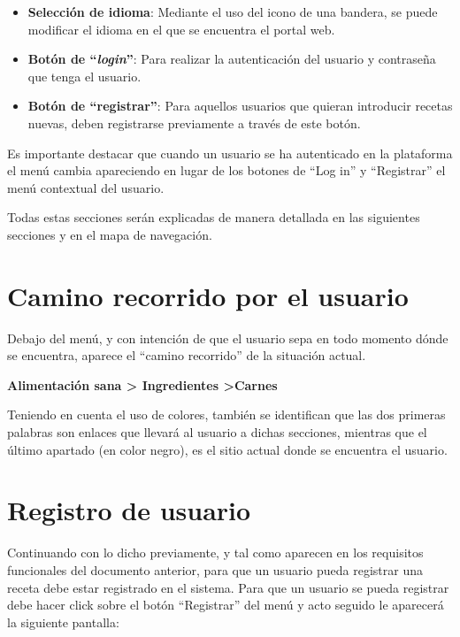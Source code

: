 \documentclass{\ClassPath/viu-tfm-template}
\begin{document}
\begin{itemize}
    \item \textbf{Selección de idioma}: Mediante el uso del icono de una bandera, se puede modificar el idioma en el que se encuentra el portal web.

    \item \textbf{Botón de “\textit{login}”}: Para realizar la autenticación del usuario y contraseña que tenga el usuario.

    \item \textbf{Botón de “registrar”}: Para aquellos usuarios que quieran introducir recetas nuevas, deben registrarse previamente a través de este botón.
    \vspace{-1em}
\end{itemize}

Es importante destacar que cuando un usuario se ha autenticado en la plataforma el menú cambia apareciendo en lugar de los botones de “Log in” y “Registrar” el menú contextual del usuario.

Todas estas secciones serán explicadas de manera detallada en las siguientes secciones y en el mapa de navegación.

\section{Camino recorrido por el usuario}

Debajo del menú, y con intención de que el usuario sepa en todo momento dónde se encuentra, aparece el “camino recorrido” de la situación actual.

\begin{center}
    \vspace{-10pt}
    \textbf{\color{maincolor}Alimentación sana > \space Ingredientes \color{black} >\space Carnes}
    \vspace{-15pt}
\end{center}

Teniendo en cuenta el uso de colores, también se identifican que las dos primeras palabras son enlaces que llevará al usuario a dichas secciones, mientras que el último apartado (en color negro), es el sitio actual donde se encuentra el usuario.


\section{Registro de usuario}
Continuando con lo dicho previamente, y tal como aparecen en los requisitos funcionales del documento anterior, para que un usuario pueda registrar una receta debe estar registrado en el sistema. Para que un usuario se pueda registrar debe hacer click sobre el botón “Registrar” del menú y acto seguido le aparecerá la siguiente pantalla:
\end{document}
